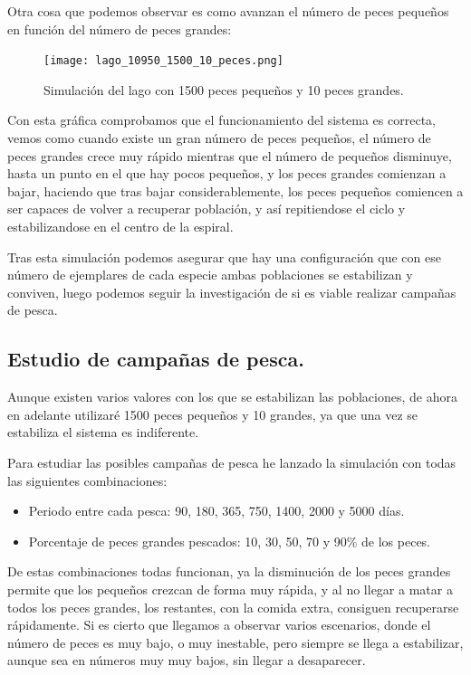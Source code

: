 \documentclass[12pt, spanish]{article}
\begin{document}
Otra cosa que podemos observar es como avanzan el número de peces pequeños en función del número de peces grandes:


\begin{figure}[H]
	\centering
	\texttt{[image: lago\_10950\_1500\_10\_peces.png]}
	\caption{Simulación del lago con 1500 peces pequeños y 10 peces grandes.}
	\label{fig:ej4}
\end{figure}

Con esta gráfica comprobamos que el funcionamiento del sistema es correcta, vemos como cuando existe un gran número de peces pequeños, el número de peces grandes crece muy rápido mientras que el número de pequeños disminuye, hasta un punto en el que hay pocos pequeños, y los peces grandes comienzan a bajar, haciendo que tras bajar considerablemente, los peces pequeños comiencen a ser capaces de volver a recuperar población, y así repitiendose el ciclo y estabilizandose en el centro de la espiral.

Tras esta simulación podemos asegurar que hay una configuración que con ese número de ejemplares de cada especie ambas poblaciones se estabilizan y conviven, luego podemos seguir la investigación de si es viable realizar campañas de pesca.


\newpage

\subsection{Estudio de campañas de pesca.}

Aunque existen varios valores con los que se estabilizan las poblaciones, de ahora en adelante utilizaré 1500 peces pequeños y 10 grandes, ya que una vez se estabiliza el sistema es indiferente.


Para estudiar las posibles campañas de pesca he lanzado la simulación con todas las siguientes combinaciones:

\begin{itemize}
	\item Periodo entre cada pesca: 90, 180, 365, 750, 1400, 2000 y 5000 días.
	\item Porcentaje de peces grandes pescados: 10, 30, 50, 70 y 90\% de los peces.
\end{itemize}

De estas combinaciones todas funcionan, ya la disminución de los peces grandes permite que los pequeños crezcan de forma muy rápida, y al no llegar a matar a todos los peces grandes, los restantes, con la comida extra, consiguen recuperarse rápidamente. Si es cierto que llegamos a observar varios escenarios, donde el número de peces es muy bajo, o muy inestable, pero siempre se llega a estabilizar, aunque sea en números muy muy bajos, sin llegar a desaparecer.
\end{document}

